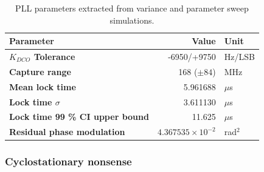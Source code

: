 		\begin{table}[h!]
			\centering
			\def\arraystretch{1.5}		
			\setlength\arrayrulewidth{0.75pt}
			\setlength{\tabcolsep}{1em} %
			\begin{tabular}{|l|r|l|}
				\hline 
				\rule[-1ex]{0pt}{2.5ex} \cellcolor{gray!40}\textbf{Parameter} & \cellcolor{gray!40}\textbf{Value} & \cellcolor{gray!40}\textbf{Unit }\\ 
				\hline 
				\rule[-1ex]{0pt}{2.5ex} \textbf{$K_{DCO}$ Tolerance}  & -6950/+9750 & Hz/LSB \\
				\hline 
				\rule[-1ex]{0pt}{2.5ex} \textbf{Capture range}  & 168 ($\pm 84$)& MHz\\ 
				\hline 
				\rule[-1ex]{0pt}{2.5ex} \textbf{Mean lock time}  & 5.961688& $\mu$s \\
				\hline 
				\rule[-1ex]{0pt}{2.5ex} \textbf{Lock time $\sigma$} & 3.611130 & $\mu$s\\ 
				\hline 
				\rule[-1ex]{0pt}{2.5ex} \textbf{Lock time 99 \% CI upper bound} & 11.625  & $\mu$s\\
				\hline 
				\rule[-1ex]{0pt}{2.5ex} \textbf{Residual phase modulation} & $4.367535\times10^{-2}$ & rad$^2$\\ 
				\hline 
			\end{tabular} 

			\caption{PLL parameters extracted from variance and parameter sweep simulations.}
			\label{simulation_params_fast}
		\end{table}


		\subsubsection{Cyclostationary nonsense}


